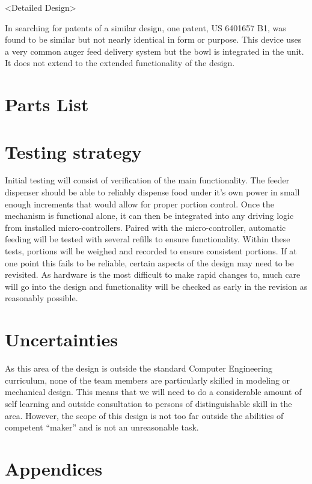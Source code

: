 \documentclass[12pt]{article}
\begin{document}
<Detailed Design>

In searching for patents of a similar design, one patent, US 6401657 B1, was found to be similar but not nearly identical in form or purpose. This device uses a very common auger feed delivery system but the bowl is integrated in the unit. It does not extend to the extended functionality of the design. 

\section{Parts List}
\section{Testing strategy}
Initial testing will consist of verification of the main functionality. The feeder dispenser should be able to reliably dispense food under it’s own power in small enough increments that would allow for proper portion control. Once the mechanism is functional alone, it can then be integrated into any driving logic from installed micro-controllers. Paired with the micro-controller, automatic feeding will be tested with several refills to ensure functionality. Within these tests, portions will be weighed and recorded to ensure consistent portions. If at one point this fails to be reliable, certain aspects of the design may need to be revisited. As hardware is the most difficult to make rapid changes to, much care will go into the design and functionality will be checked as early in the revision as reasonably possible.
\section{Uncertainties}
As this area of the design is outside the standard Computer Engineering curriculum, none of the team members are particularly skilled in modeling or mechanical design. This means that we will need to do a considerable amount of self learning and outside consultation to persons of distinguishable skill in the area. However, the scope of this design is not too far outside the abilities of competent “maker” and is not an unreasonable task.

\section{Appendices}
\end{document}
